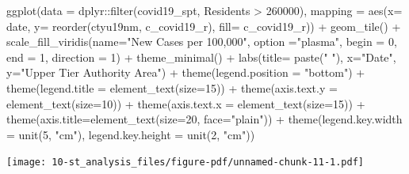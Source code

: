 \documentclass[
  letterpaper,
  DIV=11,
  numbers=noendperiod,
  oneside]{scrreprt}
\newenvironment{Shaded}{\begin{snugshade}}{\end{snugshade}}
\newcommand{\AttributeTok}[1]{\textcolor[rgb]{0.40,0.45,0.13}{#1}}
\newcommand{\DecValTok}[1]{\textcolor[rgb]{0.68,0.00,0.00}{#1}}
\newcommand{\FunctionTok}[1]{\textcolor[rgb]{0.28,0.35,0.67}{#1}}
\newcommand{\NormalTok}[1]{\textcolor[rgb]{0.00,0.23,0.31}{#1}}
\newcommand{\SpecialCharTok}[1]{\textcolor[rgb]{0.37,0.37,0.37}{#1}}
\newcommand{\StringTok}[1]{\textcolor[rgb]{0.13,0.47,0.30}{#1}}
\begin{document}
\begin{Shaded}
\begin{Highlighting}[]
\FunctionTok{ggplot}\NormalTok{(}\AttributeTok{data =}\NormalTok{ dplyr}\SpecialCharTok{::}\FunctionTok{filter}\NormalTok{(covid19\_spt, Residents }\SpecialCharTok{\textgreater{}} \DecValTok{260000}\NormalTok{), }
           \AttributeTok{mapping =} \FunctionTok{aes}\NormalTok{(}\AttributeTok{x=}\NormalTok{ date, }\AttributeTok{y=} \FunctionTok{reorder}\NormalTok{(ctyu19nm, c\_covid19\_r), }\AttributeTok{fill=}\NormalTok{ c\_covid19\_r)) }\SpecialCharTok{+}
  \FunctionTok{geom\_tile}\NormalTok{() }\SpecialCharTok{+}
  \FunctionTok{scale\_fill\_viridis}\NormalTok{(}\AttributeTok{name=}\StringTok{"New Cases per 100,000"}\NormalTok{, }\AttributeTok{option =}\StringTok{"plasma"}\NormalTok{, }\AttributeTok{begin =} \DecValTok{0}\NormalTok{, }\AttributeTok{end =} \DecValTok{1}\NormalTok{, }\AttributeTok{direction =} \DecValTok{1}\NormalTok{) }\SpecialCharTok{+}
  \FunctionTok{theme\_minimal}\NormalTok{() }\SpecialCharTok{+} 
  \FunctionTok{labs}\NormalTok{(}\AttributeTok{title=} \FunctionTok{paste}\NormalTok{(}\StringTok{" "}\NormalTok{), }\AttributeTok{x=}\StringTok{"Date"}\NormalTok{, }\AttributeTok{y=}\StringTok{"Upper Tier Authority Area"}\NormalTok{) }\SpecialCharTok{+}
  \FunctionTok{theme}\NormalTok{(}\AttributeTok{legend.position =} \StringTok{"bottom"}\NormalTok{) }\SpecialCharTok{+}
  \FunctionTok{theme}\NormalTok{(}\AttributeTok{legend.title =} \FunctionTok{element\_text}\NormalTok{(}\AttributeTok{size=}\DecValTok{15}\NormalTok{)) }\SpecialCharTok{+}
  \FunctionTok{theme}\NormalTok{(}\AttributeTok{axis.text.y =} \FunctionTok{element\_text}\NormalTok{(}\AttributeTok{size=}\DecValTok{10}\NormalTok{)) }\SpecialCharTok{+}
  \FunctionTok{theme}\NormalTok{(}\AttributeTok{axis.text.x =} \FunctionTok{element\_text}\NormalTok{(}\AttributeTok{size=}\DecValTok{15}\NormalTok{)) }\SpecialCharTok{+}
  \FunctionTok{theme}\NormalTok{(}\AttributeTok{axis.title=}\FunctionTok{element\_text}\NormalTok{(}\AttributeTok{size=}\DecValTok{20}\NormalTok{, }\AttributeTok{face=}\StringTok{"plain"}\NormalTok{)) }\SpecialCharTok{+}
  \FunctionTok{theme}\NormalTok{(}\AttributeTok{legend.key.width =} \FunctionTok{unit}\NormalTok{(}\DecValTok{5}\NormalTok{, }\StringTok{"cm"}\NormalTok{), }\AttributeTok{legend.key.height =} \FunctionTok{unit}\NormalTok{(}\DecValTok{2}\NormalTok{, }\StringTok{"cm"}\NormalTok{))}
\end{Highlighting}
\end{Shaded}

\texttt{[image: 10-st\_analysis\_files/figure-pdf/unnamed-chunk-11-1.pdf]}
\end{document}
